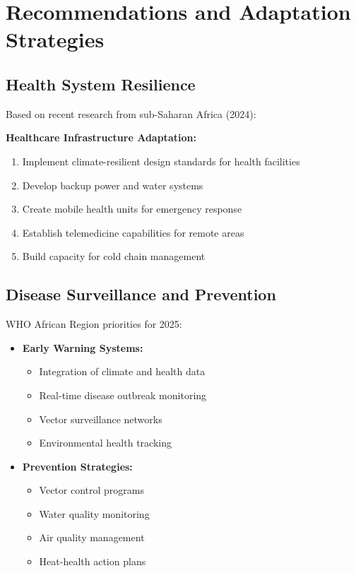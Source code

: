 \section{Recommendations and Adaptation Strategies}
\label{sec:recommendations}

\subsection{Health System Resilience}
Based on recent research from sub-Saharan Africa (2024):

\begin{recommendation}
\textbf{Healthcare Infrastructure Adaptation:}
\begin{enumerate}
    \item Implement climate-resilient design standards for health facilities
    \item Develop backup power and water systems
    \item Create mobile health units for emergency response
    \item Establish telemedicine capabilities for remote areas
    \item Build capacity for cold chain management
\end{enumerate}
\end{recommendation}

\subsection{Disease Surveillance and Prevention}
WHO African Region priorities for 2025:

\begin{itemize}
    \item \textbf{Early Warning Systems:}
    \begin{itemize}
        \item Integration of climate and health data
        \item Real-time disease outbreak monitoring
        \item Vector surveillance networks
        \item Environmental health tracking
    \end{itemize}
    
    \item \textbf{Prevention Strategies:}
    \begin{itemize}
        \item Vector control programs
        \item Water quality monitoring
        \item Air quality management
        \item Heat-health action plans
    \end{itemize}
\end{itemize}

